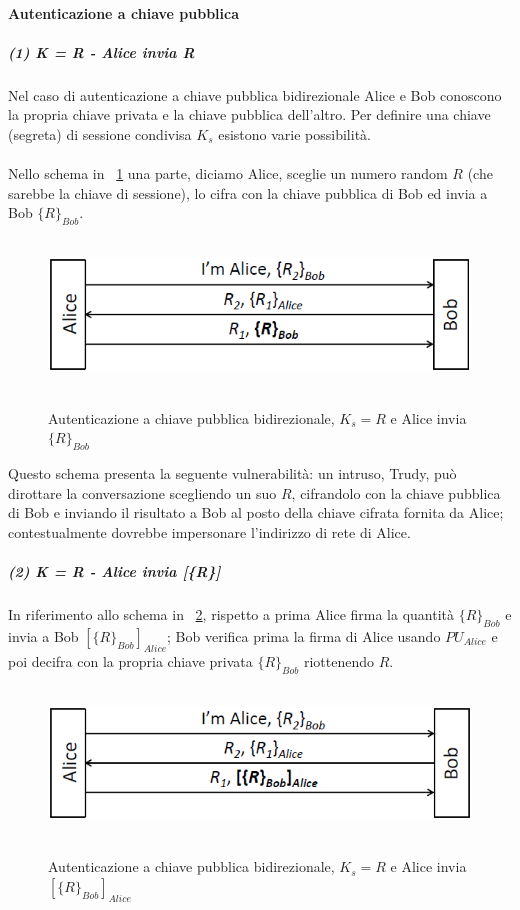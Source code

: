 \paragraph{Autenticazione a chiave pubblica}
\subparagraph{(1) \textit{K = R} - Alice invia \textit{{R}}}
\label{subsec:caso1}
Nel caso di autenticazione a chiave pubblica bidirezionale Alice e Bob conoscono la propria chiave privata e la chiave pubblica dell'altro. Per definire una chiave (segreta) di sessione condivisa $K_{s}$ esistono varie possibilità.\\ \\
Nello schema in \figurename~\ref{fig:ImgS67bis} una parte, diciamo Alice, sceglie un numero random $R$ (che sarebbe la chiave di sessione), lo cifra con la chiave pubblica di Bob ed invia a Bob $\lbrace R\rbrace_{Bob}$.
\begin{figure}[htbp]
	\centering%
	\subfigure%
	{\includegraphics[height=4cm, width=12cm, keepaspectratio]{Immagini/autenticazione/ImgS67bis.png}}
	\caption{Autenticazione a chiave pubblica bidirezionale, $K_{s} = R$ e Alice invia $\lbrace R\rbrace_{Bob}$}\label{fig:ImgS67bis} 	
\end{figure}
Questo schema presenta la seguente vulnerabilità: un intruso, Trudy, può dirottare la conversazione scegliendo un suo $R$, cifrandolo con la chiave pubblica di Bob e inviando il risultato a Bob al posto della chiave cifrata fornita da Alice; contestualmente dovrebbe impersonare l'indirizzo di rete di Alice.
\subparagraph{(2) \textit{K} = R - Alice invia \textit{[\{R\}]}}
In riferimento allo schema in \figurename~\ref{fig:ImgS69bis}, rispetto a prima Alice firma la quantità $\lbrace R\rbrace_{Bob}$ e invia a Bob $[\lbrace R\rbrace_{Bob}]_{Alice}$; Bob verifica prima la firma di Alice usando $PU_{Alice}$ e poi decifra con la propria chiave privata $\lbrace R\rbrace_{Bob}$ riottenendo $R$.
\begin{figure}[htbp]
	\centering%
	\subfigure%
	{\includegraphics[height=4cm, width=12cm, keepaspectratio]{Immagini/autenticazione/ImgS69bis.png}}
	\caption{Autenticazione a chiave pubblica bidirezionale, $K_{s} = R$ e Alice invia $[\lbrace R\rbrace_{Bob}]_{Alice}$}\label{fig:ImgS69bis} 	
\end{figure}
